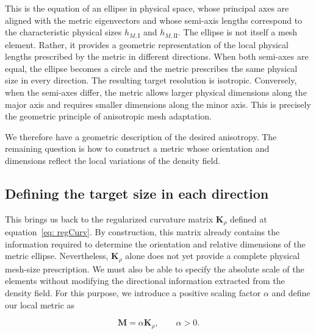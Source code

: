 \documentclass[11pt,a4paper]{article}
\begin{document}
\noindent
This is the equation of an ellipse in physical space,
whose principal axes are aligned with the metric eigenvectors
and whose semi-axis lengths correspond
to the characteristic physical sizes
$h_{M,\mathrm{I}}$ and $h_{M,\mathrm{II}}$. 
The ellipse is not itself a mesh element. 
Rather, it provides a geometric representation of the local
physical lengths prescribed by the metric in different
directions.
When both semi-axes are equal, the ellipse becomes
a circle and the metric prescribes the same physical
size in every direction. The resulting target
resolution is isotropic.
Conversely, when the semi-axes differ, the metric
allows larger physical dimensions along the major
axis and requires smaller dimensions along the minor
axis. This is precisely the geometric principle of
anisotropic mesh adaptation.


\begin{figure}[h!]
    \centering
    \resizebox{0.5\linewidth}{!}{%
    }
    \label{fig:metric_ellipse}
\end{figure}

\noindent
We therefore have a geometric description of the
desired anisotropy. The remaining question is how
to construct a metric whose orientation and dimensions
reflect the local variations of the density field.


\subsection{Defining the target size in each direction}

\noindent
This brings us back to the regularized curvature matrix
$\mathbf{K}_\rho$ defined at equation~\ref{eq: regCurv}.
By construction, this matrix already contains the
information required to determine the orientation
and relative dimensions of the metric ellipse.
Nevertheless, $\mathbf{K}_\rho$ alone does not yet
provide a complete physical mesh-size prescription.
We must also be able to specify the absolute scale
of the elements without modifying the directional
information extracted from the density field.
For this purpose, we introduce a positive scaling
factor $\alpha$ and define our local metric as

\begin{equation}
    \boxed{
        \mathbf{M}=\alpha\mathbf{K}_\rho,
        \qquad \alpha>0.
    }
\end{equation}
\end{document}
